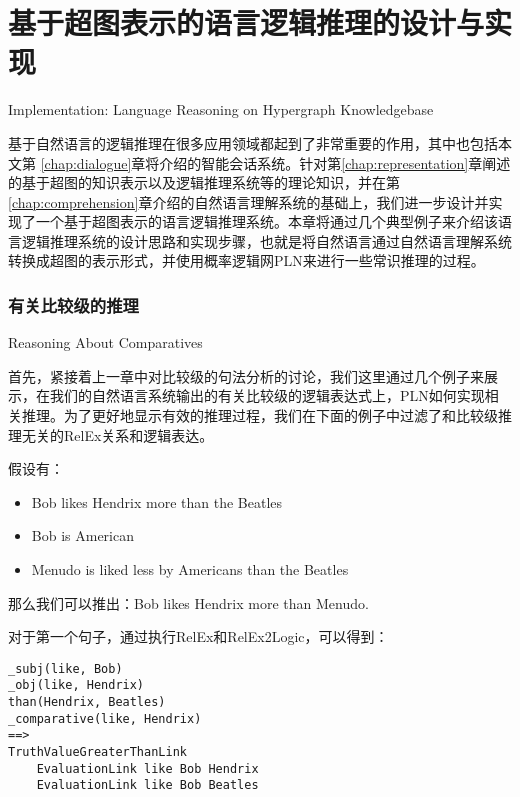 

\chapter{基于超图表示的语言逻辑推理的设计与实现}{Implementation: Language Reasoning on Hypergraph Knowledgebase}
\label{chap:reasoning}

基于自然语言的逻辑推理在很多应用领域都起到了非常重要的作用，其中也包括本文第 \ref{chap:dialogue}章将介绍的智能会话系统。针对第\ref{chap:representation}章阐述的基于超图的知识表示以及逻辑推理系统等的理论知识，并在第 \ref{chap:comprehension}章介绍的自然语言理解系统的基础上，我们进一步设计并实现了一个基于超图表示的语言逻辑推理系统。本章将通过几个典型例子来介绍该语言逻辑推理系统的设计思路和实现步骤，也就是将自然语言通过自然语言理解系统转换成超图的表示形式，并使用概率逻辑网PLN来进行一些常识推理的过程。


\subsection{有关比较级的推理}{Reasoning About Comparatives}

首先，紧接着上一章中对比较级的句法分析的讨论，我们这里通过几个例子来展示，在我们的自然语言系统输出的有关比较级的逻辑表达式上，PLN如何实现相关推理。为了更好地显示有效的推理过程，我们在下面的例子中过滤了和比较级推理无关的RelEx关系和逻辑表达。

假设有：

\begin{itemize}
\item Bob likes Hendrix more than the Beatles
\item Bob is American
\item Menudo is liked less by Americans than the Beatles
\end{itemize}

\noindent 那么我们可以推出：Bob likes Hendrix more than Menudo.

对于第一个句子，通过执行RelEx和RelEx2Logic，可以得到：

 {\tt\begin{small}\begin{lstlisting}
_subj(like, Bob)
_obj(like, Hendrix)
than(Hendrix, Beatles)
_comparative(like, Hendrix)
==>
TruthValueGreaterThanLink
    EvaluationLink like Bob Hendrix
    EvaluationLink like Bob Beatles
\end{lstlisting}\end{small}}

